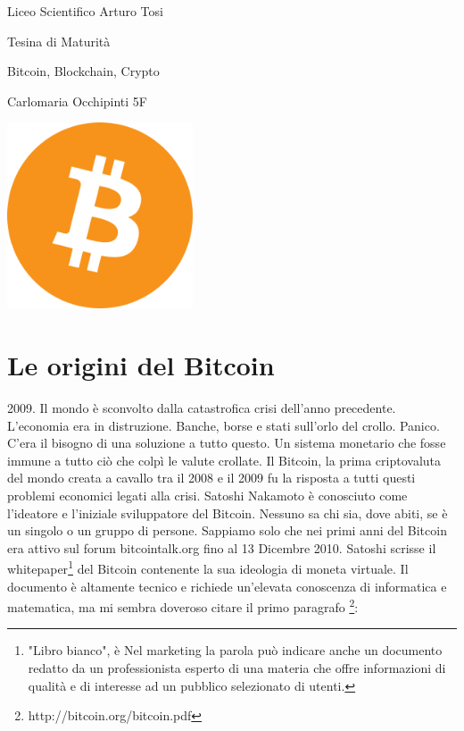 \documentclass {article}
\begin{document}
\begin {titlepage}

\centering
{\LARGE Liceo Scientifico Arturo Tosi \par}
\vspace{1cm}
{\Large Tesina di Maturità\par}
\vspace{1.5cm}
{\huge Bitcoin, Blockchain, Crypto\par}
\vspace{2cm}
{\Large Carlomaria Occhipinti 5F\par}
\vfill
\includegraphics [width = 5.5cm] {logo.png}
\vfill

\end {titlepage}


\newpage

\tableofcontents
{}

\newpage


\section {Le origini del Bitcoin}


2009. Il mondo è sconvolto dalla catastrofica crisi dell'anno precedente.
L'economia era in distruzione. Banche, borse e stati sull'orlo del crollo. Panico.
C'era il bisogno di una soluzione a tutto questo. Un sistema monetario che fosse immune a tutto ciò che colpì le valute crollate. Il Bitcoin, la prima criptovaluta del mondo creata a cavallo tra il 2008 e il 2009 fu la risposta a tutti questi problemi economici legati alla crisi.
Satoshi Nakamoto è conosciuto come l'ideatore e l'iniziale sviluppatore del Bitcoin. Nessuno sa chi sia, dove abiti, se è un singolo o un gruppo di persone. Sappiamo solo che nei primi anni del Bitcoin era attivo sul forum bitcointalk.org fino al 13 Dicembre 2010.
Satoshi scrisse il whitepaper\footnote{"Libro bianco", è Nel marketing la parola può indicare anche un documento redatto da un professionista esperto di una materia che offre informazioni di qualità e di interesse ad un pubblico selezionato di utenti.} del Bitcoin contenente la sua ideologia di moneta virtuale. Il documento è altamente tecnico e richiede un'elevata conoscenza di informatica e matematica, ma mi sembra doveroso citare il primo paragrafo \footnote{http://bitcoin.org/bitcoin.pdf}:\\
\end{document}
